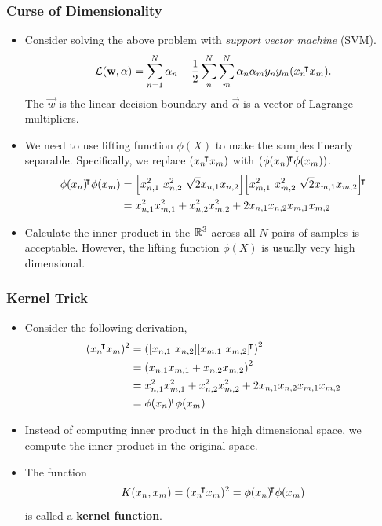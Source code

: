 \documentclass[10pt]{../formats/RU}
\begin{document}
\begin{frame}
\frametitle{Curse of Dimensionality}
\begin{itemize}
  \item<1-> Consider solving the above problem with \emph{support vector machine} (SVM).
  \begin{align*}
    \mathcal{L}(\mathbf{w}, \mathbf{\alpha}) = \sum_{n=1}^N\alpha_n - \frac{1}{2}\sum_{n}^{N}\sum_{m}^{N}\alpha_n\alpha_m y_ny_m(x_n{}^{\mkern-4mu\intercal} x_m).
  \end{align*}
  The $\vec{w}$ is the linear decision boundary and $\vec{\alpha}$ is a vector of Lagrange multipliers.
  \item <2-> We need to use lifting function $\phi(X)$ to make the samples linearly separable. Specifically, we replace $(x_n{}^{\mkern-4mu\intercal} x_m)$ with $(\phi(x_n){}^{\mkern-4mu\intercal}\phi(x_m))$.
  \begin{align*}
    \phi(x_n)\trn\phi(x_m) 
    &= \bracks*{x_{n,1}^2 \ x_{n,2}^2 \ \sqrt{2}x_{n,1}x_{n,2}}\bracks*{x_{m,1}^2 \ x_{m,2}^2 \ \sqrt{2}x_{m,1}x_{m,2}}\trn \\
    &= x_{n,1}^2x_{m,1}^2 + x_{n,2}^2x_{m,2}^2 + 2x_{n,1}x_{n,2}x_{m,1}x_{m,2}
  \end{align*}
  \item<3-> Calculate the inner product in the $\mathbb{R}^3$ across all $N$ pairs of samples is acceptable. However, the lifting function $\phi(X)$ is usually very high dimensional.
\end{itemize}
\end{frame}
\begin{frame}
  \frametitle{Kernel Trick}
  \begin{itemize}
    \item <1-> Consider the following derivation,
    \begin{align*}
      (x_n\trn x_m)^2 
      &= \parens*{\bracks*{x_{n,1} \ x_{n,2}}\bracks*{x_{m,1} \ x_{m,2}}\trn}^2 \\
      &= \parens*{x_{n,1}x_{m,1} + x_{n,2}x_{m,2}}^2 \\
      &= x_{n,1}^2x_{m,1}^2 + x_{n,2}^2x_{m,2}^2 + 2x_{n,1}x_{n,2}x_{m,1}x_{m,2} \\
      &= \phi(x_n)\trn\phi(x_m)
    \end{align*}
    \item <2-> Instead of computing inner product in the high dimensional space, we compute the inner product in the original space.
    \item <3-> The function 
    \begin{align*}
      K(x_n, x_m) = (x_n{}^{\mkern-4mu\intercal} x_m)^2 = \phi(x_n){}^{\mkern-4mu\intercal}\phi(x_m)
    \end{align*}
     is called a \textbf{kernel function}.
  \end{itemize}
\end{frame}
\end{document}
